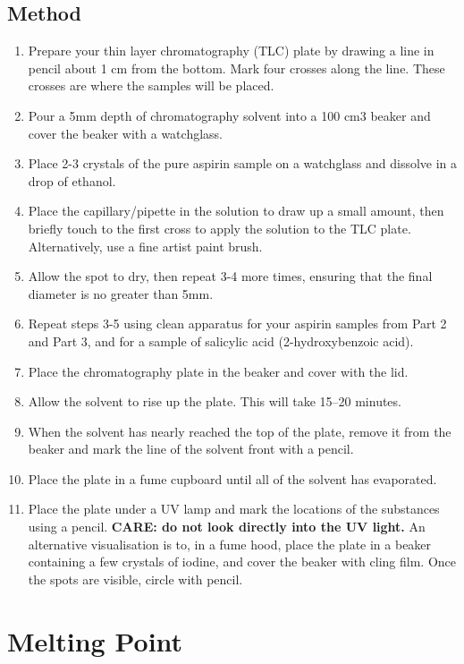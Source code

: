 \section{Method}
\begin{enumerate}
    \item Prepare your thin layer chromatography (TLC) plate by drawing a line in pencil about 1 cm from the bottom. Mark four crosses along the line. These crosses are where the samples will be placed. 
    \item Pour a 5mm depth of chromatography solvent into a 100 cm3 beaker and cover the beaker with a watchglass. 
    \item Place 2-3 crystals of the pure aspirin sample on a watchglass and dissolve in a drop of ethanol.
    \item Place the capillary/pipette in the solution to draw up a small amount, then briefly touch to the first cross to apply the solution to the TLC plate. Alternatively, use a fine artist paint brush.
    \item Allow the spot to dry, then repeat 3-4 more times, ensuring that the final diameter is no greater than 5mm.
    \item Repeat steps 3-5 using clean apparatus for your aspirin samples from Part 2 and Part 3, and for a sample of salicylic acid (2-hydroxybenzoic acid).
    \item Place the chromatography plate in the beaker and cover with the lid.
    \item Allow the solvent to rise up the plate. This will take 15–20 minutes.
    \item When the solvent has nearly reached the top of the plate, remove it from the beaker and mark the line of the solvent front with a pencil.
    \item Place the plate in a fume cupboard until all of the solvent has evaporated.
    \item Place the plate under a UV lamp and mark the locations of the substances using a pencil. \textbf{CARE: do not look directly into the UV light.} An alternative visualisation is to, in a fume hood, place the plate in a beaker containing a few crystals of iodine, and cover the beaker with cling film. Once the spots are visible, circle with pencil. 
\end{enumerate}

\newpage
\chapter{Melting Point}
